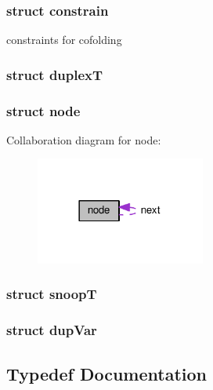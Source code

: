 \subsubsection{struct constrain}
constraints for cofolding \label{structduplexT}
\hypertarget{group__data__structures_structduplexT}{}
\subsubsection{struct duplex\+T}
\label{structnode}
\hypertarget{group__data__structures_structnode}{}
\subsubsection{struct node}


Collaboration diagram for node\+:
\nopagebreak
\begin{figure}[H]
\begin{center}
\leavevmode
\includegraphics[width=158pt]{structnode__coll__graph}
\end{center}
\end{figure}
\label{structsnoopT}
\hypertarget{group__data__structures_structsnoopT}{}
\subsubsection{struct snoop\+T}
\label{structdupVar}
\hypertarget{group__data__structures_structdupVar}{}
\subsubsection{struct dup\+Var}


\subsection{Typedef Documentation}
\hypertarget{group__data__structures_ga4381025ffbd692e54189b2c679c79c99}{}

